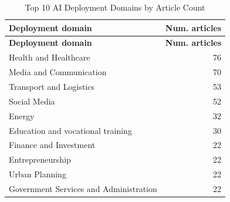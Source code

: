 \begin{longtable}{p{9cm}r}
\caption{Top 10 AI Deployment Domains by Article Count}
\label{tab:top_domains_by_article_count}\\
\toprule
\textbf{Deployment domain} & \textbf{Num. articles} \\
\midrule
\endfirsthead
\toprule
\textbf{Deployment domain} & \textbf{Num. articles} \\
\midrule
\endhead
\endfoot
\endlastfoot
Health and Healthcare & 76 \\
Media and Communication & 70 \\
Transport and Logistics & 53 \\
Social Media & 52 \\
Energy & 32 \\
Education and vocational training & 30 \\
Finance and Investment & 22 \\
Entrepreneurship & 22 \\
Urban Planning & 22 \\
Government Services and Administration & 22 \\
\bottomrule
\end{longtable}